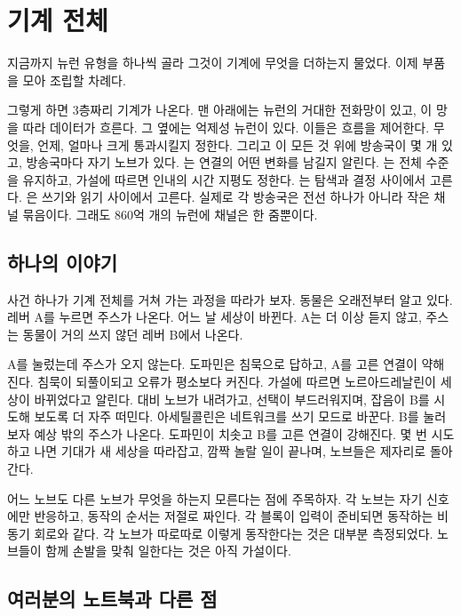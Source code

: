 \chapter{기계 전체}


지금까지 뉴런 유형을 하나씩 골라 그것이 기계에 무엇을 더하는지 물었다. 이제 부품을 모아 조립할 차례다.

그렇게 하면 3층짜리 기계가 나온다. 맨 아래에는  뉴런의 거대한 전화망이 있고, 이 망을 따라 데이터가 흐른다. 그 옆에는 억제성  뉴런이 있다. 이들은 흐름을 제어한다. 무엇을, 언제, 얼마나 크게 통과시킬지 정한다. 그리고 이 모든 것 위에 방송국이 몇 개 있고, 방송국마다 자기 노브가 있다. 는 연결의 어떤 변화를 남길지 알린다. 는 전체 수준을 유지하고, 가설에 따르면 인내의 시간 지평도 정한다. 는 탐색과 결정 사이에서 고른다. 은 쓰기와 읽기 사이에서 고른다. 실제로 각 방송국은 전선 하나가 아니라 작은 채널 묶음이다. 그래도 860억 개의 뉴런에 채널은 한 줌뿐이다.

\section*{하나의 이야기}

사건 하나가 기계 전체를 거쳐 가는 과정을 따라가 보자. 동물은 오래전부터 알고 있다. 레버 A를 누르면 주스가 나온다. 어느 날 세상이 바뀐다. A는 더 이상 듣지 않고, 주스는 동물이 거의 쓰지 않던 레버 B에서 나온다.

A를 눌렀는데 주스가 오지 않는다. 도파민은 침묵으로 답하고, A를 고른 연결이 약해진다. 침묵이 되풀이되고 오류가 평소보다 커진다. 가설에 따르면 노르아드레날린이 세상이 바뀌었다고 알린다. 대비 노브가 내려가고, 선택이 부드러워지며, 잡음이 B를 시도해 보도록 더 자주 떠민다. 아세틸콜린은 네트워크를 쓰기 모드로 바꾼다. B를 눌러 보자 예상 밖의 주스가 나온다. 도파민이 치솟고 B를 고른 연결이 강해진다. 몇 번 시도하고 나면 기대가 새 세상을 따라잡고, 깜짝 놀랄 일이 끝나며, 노브들은 제자리로 돌아간다.

어느 노브도 다른 노브가 무엇을 하는지 모른다는 점에 주목하자. 각 노브는 자기 신호에만 반응하고, 동작의 순서는 저절로 짜인다. 각 블록이 입력이 준비되면 동작하는 비동기 회로와 같다. 각 노브가 따로따로 이렇게 동작한다는 것은 대부분 측정되었다. 노브들이 함께 손발을 맞춰 일한다는 것은 아직 가설이다.

\section*{여러분의 노트북과 다른 점}

